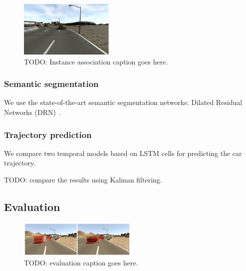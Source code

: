 \documentclass[10pt,twocolumn,letterpaper]{article}
\begin{document}
\begin{figure}[t]
        \centering
        \includegraphics[width=0.4\textwidth]{figures/double_detection.png}
        \caption{ {\small TODO: Instance association caption goes here.}}
        \label{fig:Instance_associationn}
\end{figure}


\subsubsection{Semantic segmentation}
We use the state-of-the-art semantic segmentation networks: Dilated Residual Networks (DRN)~\cite{yu2017dilated}.

\subsubsection{Trajectory prediction}

We compare two temporal models based on LSTM cells for predicting the car trajectory.

TODO: compare the results using Kalman filtering.



\subsection{Evaluation}
\begin{figure}[t]
        \centering
        \includegraphics[width=0.5\textwidth]{figures/evaluation.pdf}
        \caption{ {\small TODO: evaluation caption goes here.}}
        \label{fig:evaluation}
\end{figure}
\end{document}
